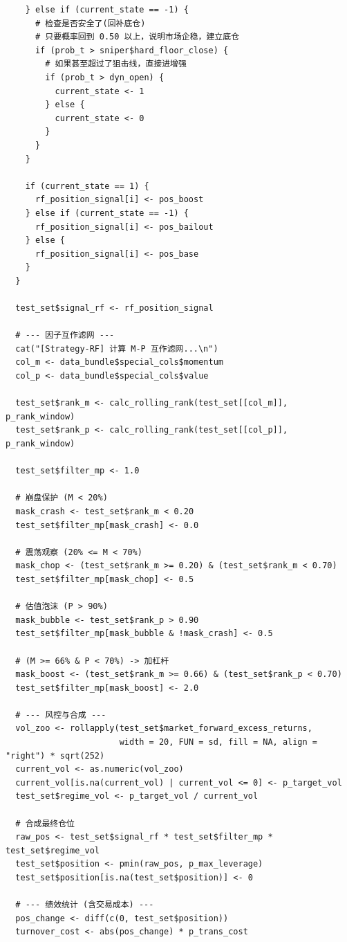 \documentclass[11pt, a4paper]{article}
\begin{document}
\begin{verbatim}
    } else if (current_state == -1) {
      # 检查是否安全了(回补底仓)
      # 只要概率回到 0.50 以上，说明市场企稳，建立底仓
      if (prob_t > sniper$hard_floor_close) {
        # 如果甚至超过了狙击线，直接进增强
        if (prob_t > dyn_open) {
          current_state <- 1
        } else {
          current_state <- 0
        }
      }
    }
  
    if (current_state == 1) {
      rf_position_signal[i] <- pos_boost
    } else if (current_state == -1) {
      rf_position_signal[i] <- pos_bailout
    } else {
      rf_position_signal[i] <- pos_base
    }
  }
  
  test_set$signal_rf <- rf_position_signal

  # --- 因子互作滤网 ---
  cat("[Strategy-RF] 计算 M-P 互作滤网...\n")
  col_m <- data_bundle$special_cols$momentum
  col_p <- data_bundle$special_cols$value
  
  test_set$rank_m <- calc_rolling_rank(test_set[[col_m]], p_rank_window)
  test_set$rank_p <- calc_rolling_rank(test_set[[col_p]], p_rank_window)
  
  test_set$filter_mp <- 1.0
  
  # 崩盘保护 (M < 20%)
  mask_crash <- test_set$rank_m < 0.20
  test_set$filter_mp[mask_crash] <- 0.0
  
  # 震荡观察 (20% <= M < 70%)
  mask_chop <- (test_set$rank_m >= 0.20) & (test_set$rank_m < 0.70)
  test_set$filter_mp[mask_chop] <- 0.5
  
  # 估值泡沫 (P > 90%)
  mask_bubble <- test_set$rank_p > 0.90
  test_set$filter_mp[mask_bubble & !mask_crash] <- 0.5
  
  # (M >= 66% & P < 70%) -> 加杠杆
  mask_boost <- (test_set$rank_m >= 0.66) & (test_set$rank_p < 0.70)
  test_set$filter_mp[mask_boost] <- 2.0
  
  # --- 风控与合成 ---
  vol_zoo <- rollapply(test_set$market_forward_excess_returns, 
                       width = 20, FUN = sd, fill = NA, align = "right") * sqrt(252)
  current_vol <- as.numeric(vol_zoo)
  current_vol[is.na(current_vol) | current_vol <= 0] <- p_target_vol
  test_set$regime_vol <- p_target_vol / current_vol
  
  # 合成最终仓位
  raw_pos <- test_set$signal_rf * test_set$filter_mp * test_set$regime_vol
  test_set$position <- pmin(raw_pos, p_max_leverage)
  test_set$position[is.na(test_set$position)] <- 0
  
  # --- 绩效统计 (含交易成本) ---
  pos_change <- diff(c(0, test_set$position))
  turnover_cost <- abs(pos_change) * p_trans_cost
  

\end{verbatim}
\end{document}
